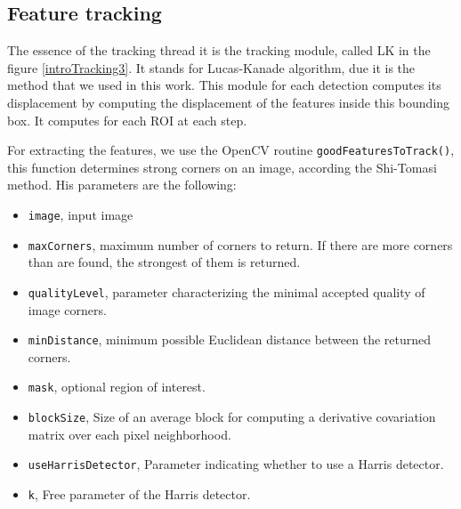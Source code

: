 \subsection{Feature tracking}




The essence of the tracking thread it is the tracking module, called LK in the figure \ref{introTracking3}. It stands for Lucas-Kanade algorithm, due it is the method that we used in this work. This module for each detection computes its displacement by computing the displacement of the features inside this bounding box. It computes for each ROI at each step.




%



For extracting the features, we use the OpenCV routine \texttt{goodFeaturesToTrack()}, this function determines strong corners on an image, according the Shi-Tomasi method. His parameters are the following:
 
\begin{itemize}

\item \texttt{image}, input image

\item \texttt{maxCorners}, maximum number of corners to return. If there are more corners than are found, the strongest of them is returned.
\item \texttt{qualityLevel}, parameter characterizing the minimal accepted quality of image corners.
\item \texttt{minDistance}, minimum possible Euclidean distance between the returned corners.
\item \texttt{mask}, optional region of interest.
\item \texttt{blockSize}, Size of an average block for computing a derivative covariation matrix over each pixel neighborhood.
\item \texttt{useHarrisDetector},  Parameter indicating whether to use a Harris detector.
\item \texttt{k},  Free parameter of the Harris detector.

\end{itemize}

